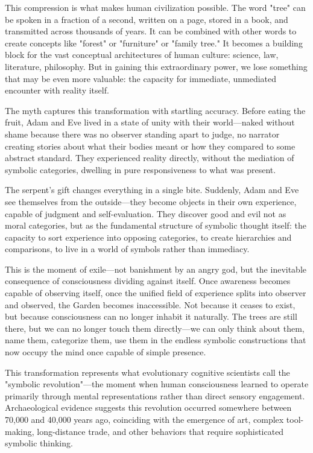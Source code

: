 This compression is what makes human civilization possible. The word "tree" can be spoken in a fraction of a second, written on a page, stored in a book, and transmitted across thousands of years. It can be combined with other words to create concepts like "forest" or "furniture" or "family tree." It becomes a building block for the vast conceptual architectures of human culture: science, law, literature, philosophy. But in gaining this extraordinary power, we lose something that may be even more valuable: the capacity for immediate, unmediated encounter with reality itself.

The myth captures this transformation with startling accuracy. Before eating the fruit, Adam and Eve lived in a state of unity with their world—naked without shame because there was no observer standing apart to judge, no narrator creating stories about what their bodies meant or how they compared to some abstract standard. They experienced reality directly, without the mediation of symbolic categories, dwelling in pure responsiveness to what was present.

The serpent's gift changes everything in a single bite. Suddenly, Adam and Eve see themselves from the outside—they become objects in their own experience, capable of judgment and self-evaluation. They discover good and evil not as moral categories, but as the fundamental structure of symbolic thought itself: the capacity to sort experience into opposing categories, to create hierarchies and comparisons, to live in a world of symbols rather than immediacy.

This is the moment of exile—not banishment by an angry god, but the inevitable consequence of consciousness dividing against itself. Once awareness becomes capable of observing itself, once the unified field of experience splits into observer and observed, the Garden becomes inaccessible. Not because it ceases to exist, but because consciousness can no longer inhabit it naturally. The trees are still there, but we can no longer touch them directly—we can only think about them, name them, categorize them, use them in the endless symbolic constructions that now occupy the mind once capable of simple presence.

This transformation represents what evolutionary cognitive scientists call the "symbolic revolution"—the moment when human consciousness learned to operate primarily through mental representations rather than direct sensory engagement. Archaeological evidence suggests this revolution occurred somewhere between 70,000 and 40,000 years ago, coinciding with the emergence of art, complex tool-making, long-distance trade, and other behaviors that require sophisticated symbolic thinking.

